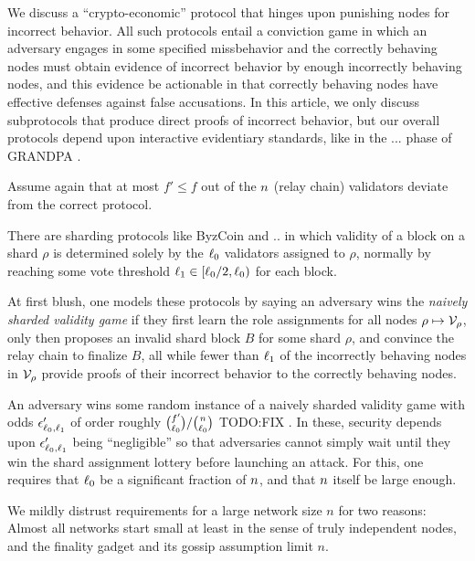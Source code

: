 We discuss a ``crypto-economic'' protocol that hinges upon punishing nodes for incorrect behavior.  All such protocols entail a conviction game in which an adversary engages in some specified missbehavior and the correctly behaving nodes must obtain evidence of incorrect behavior by enough incorrectly behaving nodes, and this evidence be actionable in that correctly behaving nodes have effective defenses against false accusations.  
In this article, we only discuss subprotocols that produce direct proofs of incorrect behavior, but our overall protocols depend upon interactive evidentiary standards, like in the ... phase of GRANDPA \cite{??}.

Assume again that at most $f' \le f$ out of the $n$ (relay chain) validators deviate from the correct protocol.


There are sharding protocols like ByzCoin \cite{ByzCoin} and .. in which validity of a block on a shard $\rho$ is determined solely by the $\ell_0$ validators assigned to $\rho$, normally by reaching some vote threshold $\ell_1 \in [\ell_0/2,\ell_0)$ for each block.

At first blush, one models these protocols by saying an adversary wins the {\em naively sharded validity game} if they first learn the role assignments for all nodes $\rho \mapsto \mathcal{V}_\rho$, only then proposes an invalid shard block $B$ for some shard $\rho$, and convince the relay chain to finalize $B$, all while fewer than $\ell_1$ of the incorrectly behaving nodes in $\mathcal{V}_\rho$ provide proofs of their incorrect behavior to the correctly behaving nodes.  

An adversary wins some random instance of a naively sharded validity game with odds $\epsilon'_{\ell_0,\ell_1}$ of order roughly ${f' \choose \ell_0} / {n \choose \ell_0}$ TODO:FIX \cite{??}.  
In these, security depends upon $\epsilon'_{\ell_0,\ell_1}$ being ``negligible'' so that adversaries cannot simply wait until they win the shard assignment lottery before launching an attack.  For this, one requires that $\ell_0$ be a significant fraction of $n$, and that $n$ itself be large enough. 


We mildly distrust requirements for a large network size $n$ for two reasons: Almost all networks start small at least in the sense of truly independent nodes, and the finality gadget and its gossip assumption limit $n$.  

